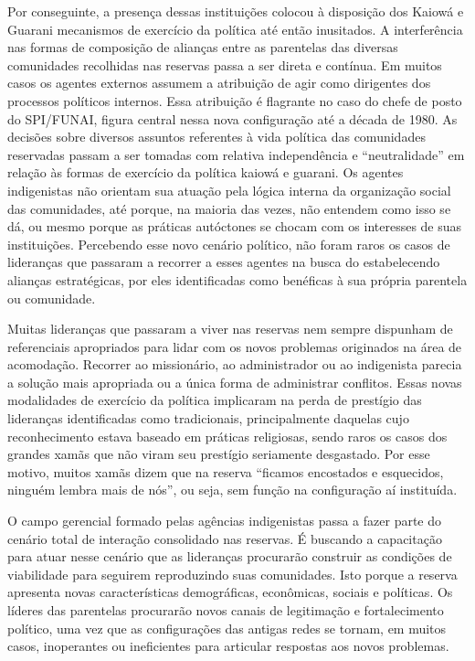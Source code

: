 \documentclass{article}
\begin{document}
Por conseguinte, a presen\c{c}a dessas institui\c{c}\~oes colocou \`a
disposi\c{c}\~ao dos Kaiow\'a e Guarani mecanismos de exerc\'icio da
pol\'itica at\'e ent\~ao inusitados. A interfer\^encia nas formas de
composi\c{c}\~ao de alian\c{c}as entre as parentelas das diversas
comunidades recolhidas nas reservas passa a ser direta e cont\'inua. Em
muitos casos os agentes externos assumem a atribui\c{c}\~ao de agir
como dirigentes dos processos pol\'iticos internos. Essa
atribui\c{c}\~ao \'e flagrante no caso do chefe de posto do SPI/FUNAI,
figura central nessa nova configura\c{c}\~ao at\'e a d\'ecada de 1980.
As decis\~oes sobre diversos assuntos referentes \`a vida pol\'itica
das comunidades reservadas passam a ser tomadas com relativa
independ\^encia e {\textquotedblleft}neutralidade{\textquotedblright}
em rela\c{c}\~ao \`as formas de exerc\'icio da pol\'itica kaiow\'a e
guarani. Os agentes indigenistas n\~ao orientam sua atua\c{c}\~ao pela
l\'ogica interna da organiza\c{c}\~ao social das comunidades, at\'e
porque, na maioria das vezes, n\~ao entendem como isso se d\'a, ou
mesmo porque as pr\'aticas aut\'octones se chocam com os interesses de
suas institui\c{c}\~oes. Percebendo esse novo cen\'ario pol\'itico,
n\~ao foram raros os casos de lideran\c{c}as que passaram a recorrer a
esses agentes na busca do estabelecendo alian\c{c}as estrat\'egicas,
por eles identificadas como ben\'eficas \`a sua pr\'opria parentela ou
comunidade.

Muitas lideran\c{c}as que passaram a viver nas reservas nem sempre
dispunham de referenciais apropriados para lidar com os novos problemas
originados na \'area de acomoda\c{c}\~ao. Recorrer ao mission\'ario, ao
administrador ou ao indigenista parecia a solu\c{c}\~ao mais apropriada
ou a \'unica forma de administrar conflitos. Essas novas modalidades de
exerc\'icio da pol\'itica implicaram na perda de prest\'igio das
lideran\c{c}as identificadas como tradicionais, principalmente daquelas
cujo reconhecimento estava baseado em pr\'aticas religiosas, sendo
raros os casos dos grandes xam\~as que n\~ao viram seu prest\'igio
seriamente desgastado. Por esse motivo, muitos xam\~as dizem que na
reserva {\textquotedblleft}ficamos encostados e esquecidos, ningu\'em
lembra mais de n\'os{\textquotedblright}, ou seja, sem fun\c{c}\~ao na
configura\c{c}\~ao a\'i institu\'ida.

O campo gerencial formado pelas ag\^encias indigenistas passa a fazer
parte do cen\'ario total de intera\c{c}\~ao consolidado nas reservas.
\'E buscando a capacita\c{c}\~ao para atuar nesse cen\'ario que as
lideran\c{c}as procurar\~ao construir as condi\c{c}\~oes de viabilidade
para seguirem reproduzindo suas comunidades. Isto porque a reserva
apresenta novas caracter\'isticas demogr\'aficas, econ\^omicas, sociais
e pol\'iticas. Os l\'ideres das parentelas procurar\~ao novos canais de
legitima\c{c}\~ao e fortalecimento pol\'itico, uma vez que as
configura\c{c}\~oes das antigas redes se tornam, em muitos casos,
inoperantes ou ineficientes para articular respostas aos novos
problemas. 
\end{document}
